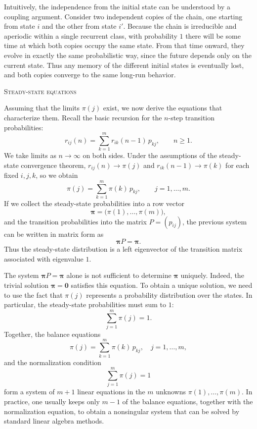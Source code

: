 Intuitively, the independence from the initial state can be understood by a coupling argument.
Consider two independent copies of the chain, one starting from state \(i\) and the other from state \(i'\).
Because the chain is irreducible and aperiodic within a single recurrent class, with probability \(1\) there will be some time at which both copies occupy the same state.
From that time onward, they evolve in exactly the same probabilistic way, since the future depends only on the current state.
Thus any memory of the different initial states is eventually lost, and both copies converge to the same long-run behavior.

\bigskip
\textsc{Steady-state equations}

Assuming that the limits \(\pi(j)\) exist, we now derive the equations that characterize them.
Recall the basic recursion for the \(n\)-step transition probabilities:
\[
r_{ij}(n)
=
\sum_{k=1}^{m} r_{ik}(n-1) \, p_{kj},
\qquad
n \ge 1.
\]
We take limits as \(n \to \infty\) on both sides.
Under the assumptions of the steady-state convergence theorem, \(r_{ij}(n) \to \pi(j)\) and \(r_{ik}(n-1) \to \pi(k)\) for each fixed \(i, j, k\), so we obtain
\[
\pi(j)
=
\sum_{k=1}^{m} \pi(k) \, p_{kj},
\qquad
j = 1, \dots, m.
\]
If we collect the steady-state probabilities into a row vector
\[
\boldsymbol{\pi}
=
\big(\pi(1), \dots, \pi(m)\big),
\]
and the transition probabilities into the matrix \(P = (p_{ij})\), the previous system can be written in matrix form as
\[
\boldsymbol{\pi} P = \boldsymbol{\pi}.
\]
Thus the steady-state distribution is a left eigenvector of the transition matrix associated with eigenvalue \(1\).

The system \(\boldsymbol{\pi} P = \boldsymbol{\pi}\) alone is not sufficient to determine \(\boldsymbol{\pi}\) uniquely.
Indeed, the trivial solution \(\boldsymbol{\pi} = \mathbf{0}\) satisfies this equation.
To obtain a unique solution, we need to use the fact that \(\pi(j)\) represents a probability distribution over the states.
In particular, the steady-state probabilities must sum to \(1\):
\[
\sum_{j=1}^{m} \pi(j) = 1.
\]
Together, the balance equations
\[
\pi(j) = \sum_{k=1}^{m} \pi(k) \, p_{kj},
\quad j = 1, \dots, m,
\]
and the normalization condition
\[
\sum_{j=1}^{m} \pi(j) = 1
\]
form a system of \(m+1\) linear equations in the \(m\) unknowns \(\pi(1), \dots, \pi(m)\).
In practice, one usually keeps only \(m-1\) of the balance equations, together with the normalization equation, to obtain a nonsingular system that can be solved by standard linear algebra methods.

